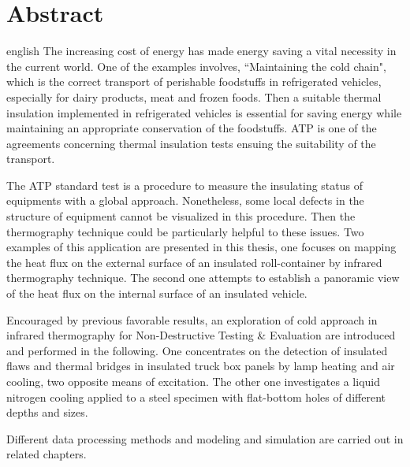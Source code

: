 \chapter*{Abstract}                      %

\begin{otherlanguage*}{english}
   The increasing cost of energy has made energy saving a vital necessity in the current world. One of the examples involves, ``Maintaining the cold chain", which is the correct transport of perishable foodstuffs in refrigerated vehicles, especially for dairy products, meat and frozen foods.  Then a suitable thermal insulation implemented in refrigerated vehicles is essential for saving energy while maintaining an appropriate conservation of the foodstuffs. ATP is one of the agreements concerning thermal insulation tests ensuing the suitability of the transport.
   
   The ATP standard test is a procedure to measure the insulating status of equipments with a global approach. Nonetheless, some local defects in the structure of equipment cannot be visualized in this procedure. Then the thermography technique could be particularly helpful to these issues. Two examples of this application are presented in this thesis, one focuses on mapping the heat flux on the external surface of an insulated roll-container by infrared thermography technique. The second one attempts to establish a panoramic view of the heat flux on the internal surface of an insulated vehicle. 
   
   Encouraged by previous favorable results, an exploration of cold approach in infrared thermography for Non-Destructive Testing \& Evaluation are introduced and performed in the following. One concentrates on the detection of insulated flaws and thermal bridges in insulated truck box panels by lamp heating and air cooling, two opposite means of excitation. The other one investigates a liquid nitrogen cooling applied to a steel specimen with flat-bottom holes of different depths and sizes.
   
   Different data processing methods and modeling and simulation are carried out in related chapters. 
\end{otherlanguage*}
